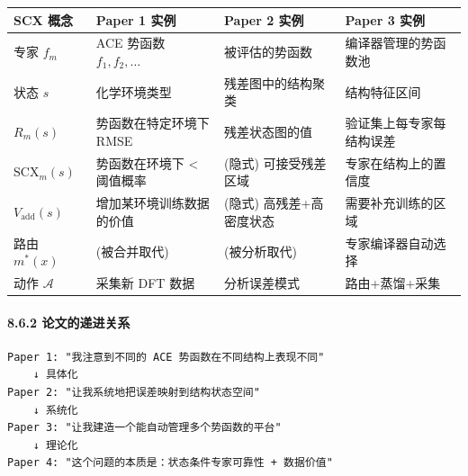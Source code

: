 \documentclass[
  12pt,
]{ctexart}
\begin{document}
\begin{longtable}[]{@{}
  >{\raggedright\arraybackslash}p{}
  >{\raggedright\arraybackslash}p{}
  >{\raggedright\arraybackslash}p{}
  >{\raggedright\arraybackslash}p{}@{}}
\toprule\noalign{}
\begin{minipage}[b]{\linewidth}\raggedright
SCX 概念
\end{minipage} & \begin{minipage}[b]{\linewidth}\raggedright
Paper 1 实例
\end{minipage} & \begin{minipage}[b]{\linewidth}\raggedright
Paper 2 实例
\end{minipage} & \begin{minipage}[b]{\linewidth}\raggedright
Paper 3 实例
\end{minipage} \\
\midrule\noalign{}
\endhead
\bottomrule\noalign{}
\endlastfoot
专家 \(f_m\) & ACE 势函数 \(f_1, f_2, \dots\) & 被评估的势函数 &
编译器管理的势函数池 \\
状态 \(s\) & 化学环境类型 & 残差图中的结构聚类 & 结构特征区间 \\
\(R_m(s)\) & 势函数在特定环境下 RMSE & 残差状态图的值 &
验证集上每专家每结构误差 \\
\(\text{SCX}_m(s)\) & 势函数在环境下 \textless{} 阈值概率 & (隐式)
可接受残差区域 & 专家在结构上的置信度 \\
\(V_{\text{add}}(s)\) & 增加某环境训练数据的价值 & (隐式)
高残差+高密度状态 & 需要补充训练的区域 \\
路由 \(m^*(x)\) & (被合并取代) & (被分析取代) & 专家编译器自动选择 \\
动作 \(\mathcal{A}\) & 采集新 DFT 数据 & 分析误差模式 &
路由+蒸馏+采集 \\
\end{longtable}

\paragraph{8.6.2
论文的递进关系}\label{ux8bbaux6587ux7684ux9012ux8fdbux5173ux7cfb}

\begin{verbatim}
Paper 1: "我注意到不同的 ACE 势函数在不同结构上表现不同"
    ↓ 具体化
Paper 2: "让我系统地把误差映射到结构状态空间"
    ↓ 系统化
Paper 3: "让我建造一个能自动管理多个势函数的平台"
    ↓ 理论化
Paper 4: "这个问题的本质是：状态条件专家可靠性 + 数据价值"
\end{verbatim}
\end{document}
